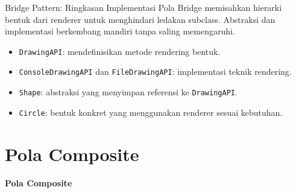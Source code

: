 \documentclass[aspectratio=169, table]{beamer}
\begin{document}
\begin{frame}[fragile]{Bridge Pattern: Ringkasan Implementasi}
	\vspace{20pt}
	Pola Bridge memisahkan hierarki bentuk dari renderer untuk menghindari ledakan subclass. 
	Abstraksi dan implementasi berkembang mandiri tanpa saling memengaruhi.
	
	\begin{itemize}
		\item \texttt{DrawingAPI}: mendefinisikan metode rendering bentuk.
		\item \texttt{ConsoleDrawingAPI} dan \texttt{FileDrawingAPI}: implementasi teknik rendering.
		\item \texttt{Shape}: abstraksi yang menyimpan referensi ke \texttt{DrawingAPI}.
		\item \texttt{Circle}: bentuk konkret yang menggunakan renderer sesuai kebutuhan.
	\end{itemize}
\end{frame}

\section{Pola Composite}

\begin{frame}{\hfill}
	\centering
	\textbf{\Huge{Pola Composite}}
\end{frame}
\end{document}
